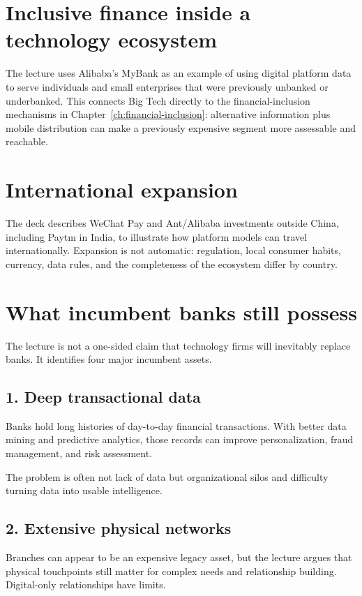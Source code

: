 \section{Inclusive finance inside a technology ecosystem}

The lecture uses Alibaba's MyBank as an example of using digital platform data to serve individuals and small enterprises that were previously unbanked or underbanked. This connects Big Tech directly to the financial-inclusion mechanisms in Chapter~\ref{ch:financial-inclusion}: alternative information plus mobile distribution can make a previously expensive segment more assessable and reachable.

\section{International expansion}

The deck describes WeChat Pay and Ant/Alibaba investments outside China, including Paytm in India, to illustrate how platform models can travel internationally. Expansion is not automatic: regulation, local consumer habits, currency, data rules, and the completeness of the ecosystem differ by country.

\section{What incumbent banks still possess}

The lecture is not a one-sided claim that technology firms will inevitably replace banks. It identifies four major incumbent assets.

\subsection{1. Deep transactional data}

Banks hold long histories of day-to-day financial transactions. With better data mining and predictive analytics, those records can improve personalization, fraud management, and risk assessment.

The problem is often not lack of data but organizational silos and difficulty turning data into usable intelligence.

\subsection{2. Extensive physical networks}

Branches can appear to be an expensive legacy asset, but the lecture argues that physical touchpoints still matter for complex needs and relationship building. Digital-only relationships have limits.

